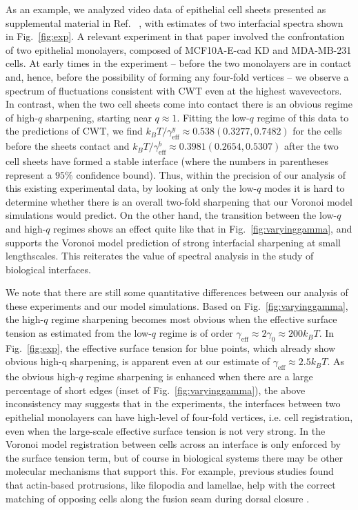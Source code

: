 \documentclass[twoside,twocolumn,9pt]{article}
\begin{document}
As an example, we analyzed video data of epithelial cell sheets presented as supplemental material in Ref. ~\cite{guan2023interfacial}, with estimates of two interfacial spectra shown in Fig.~\ref{fig:exp}. A relevant experiment in that paper involved the confrontation of two epithelial monolayers, composed of MCF10A-E-cad KD and MDA-MB-231 cells. At early times in the experiment -- before the two monolayers are in contact and, hence, before the possibility of forming any four-fold vertices -- we observe a spectrum of fluctuations consistent with CWT even at the highest wavevectors. In contrast, when the two cell sheets come into contact there is an obvious regime of high-$q$ sharpening, starting near $q\approx 1$. Fitting the low-$q$ regime of this data to the predictions of CWT, we find $k_BT/\gamma^y_{\text{eff}}\approx 0.538 (0.3277,0.7482)$ for the cells before the sheets contact and $k_BT/\gamma^b_{\text{eff}}\approx 0.3981 (0.2654, 0.5307)$ after the two cell sheets have formed a stable interface (where the numbers in parentheses represent a $95\%$ confidence bound). Thus, within the precision of our analysis of this existing experimental data, by looking at only the low-$q$ modes it is hard to determine whether there is an overall two-fold sharpening that our Voronoi model simulations would predict. On the other hand, the transition between the low-$q$ and high-$q$ regimes shows an effect quite like that in Fig.~\ref{fig:varyinggamma}, and supports the Voronoi model prediction of strong interfacial sharpening at small lengthscales. This reiterates the value of spectral analysis in the study of biological interfaces. 

We note that there are still some quantitative differences between our analysis of these experiments and our model simulations. Based on Fig.~\ref{fig:varyinggamma}, the high-$q$ regime sharpening becomes most  obvious when the effective surface tension as estimated from the low-$q$ regime is of order $\gamma_{\text{eff}}\approx 2\gamma_0 \approx 200 k_BT$. In Fig.~\ref{fig:exp}, the effective surface tension for blue points, which already show obvious high-q sharpening, is apparent even at our estimate of $\gamma_{\text{eff}}\approx 2.5k_BT$. As the obvious high-$q$ regime sharpening is enhanced when there are a large percentage of short edges (inset of Fig.~\ref{fig:varyinggamma}), the above inconsistency may suggests that in the experiments, the interfaces between two epithelial monolayers can have high-level of four-fold vertices, i.e. cell registration, even when the large-scale effective surface tension is not very strong. In the Voronoi model registration between cells across an interface is only enforced by the surface tension term, but of course in biological systems there may be other molecular mechanisms that support this.  For example, previous studies found that actin-based protrusions, like filopodia and lamellae, help with the correct matching of opposing cells along the fusion seam during dorsal closure \cite{jacinto2000dynamic,zhang2021mechanical}.    
\end{document}
